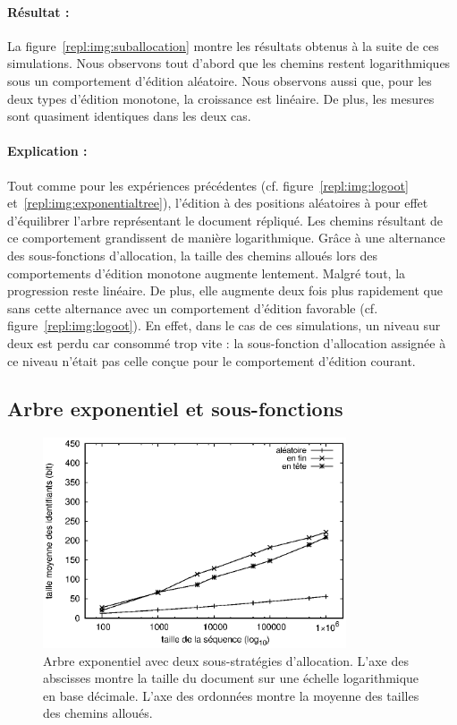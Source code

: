 \paragraph{Résultat :} La figure~\ref{repl:img:suballocation} montre les
résultats obtenus à la suite de ces simulations. Nous observons tout d'abord que
les chemins restent logarithmiques sous un comportement d'édition
aléatoire. Nous observons aussi que, pour les deux types d'édition monotone, la
croissance est linéaire. De plus, les mesures sont quasiment identiques dans les
deux cas.

\paragraph{Explication :} Tout comme pour les expériences précédentes
(cf. figure~\ref{repl:img:logoot} et~\ref{repl:img:exponentialtree}), l'édition
à des positions aléatoires à pour effet d'équilibrer l'arbre représentant le
document répliqué. Les chemins résultant de ce comportement grandissent de
manière logarithmique. Grâce à une alternance des sous-fonctions d'allocation,
la taille des chemins alloués lors des comportements d'édition monotone augmente
lentement. Malgré tout, la progression reste linéaire. De plus, elle augmente
deux fois plus rapidement que sans cette alternance avec un comportement
d'édition favorable (cf. figure~\ref{repl:img:logoot}). En effet, dans le cas de
ces simulations, un niveau sur deux est perdu car consommé trop vite : la
sous-fonction d'allocation assignée à ce niveau n'était pas celle conçue pour le
comportement d'édition courant.


\subsection{Arbre exponentiel et sous-fonctions}

\begin{figure}
  \begin{center}
    \includegraphics[width=0.8\textwidth]{img/lseq/lseq.eps}
    \caption[Combinaison de l'arbre exponentiel et des sous-fonctions
    d'allocation] {\label{repl:img:lseq} Arbre exponentiel avec deux
      sous-stratégies d'allocation. L'axe des abscisses montre la taille du
      document sur une échelle logarithmique en base décimale. L'axe des
      ordonnées montre la moyenne des tailles des chemins alloués.}
  \end{center}
\end{figure}

